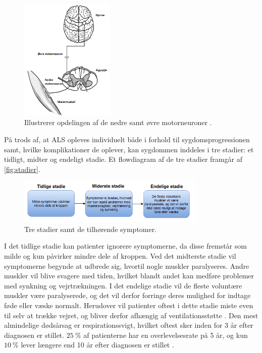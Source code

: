 \begin{figure}[H]
\centering
\includegraphics[width=0.4\textwidth]{figures/motorneuroner.png}
\caption{Illustrerer opdelingen af de nedre samt øvre motorneuroner \citep{miller2005}.}
\label{fig:motorneuroner}
\end{figure}

\noindent
På trods af, at ALS opleves individuelt både i forhold til sygdomsprogressionen samt, hvilke komplikationer de oplever, kan sygdommen inddeles i tre stadier: et tidligt, midter og endeligt stadie. Et flowdiagram af de tre stadier framgår af \autoref{fig:stadier}.

\begin{figure}[H]
\centering
\includegraphics[width=0.8\textwidth]{figures/stadier.png}
\caption{Tre stadier samt de tilhørende symptomer.}
\label{fig:stadier}
\end{figure}

\noindent
I det tidlige stadie kan patienter ignorere symptomerne, da disse fremstår som milde og kun påvirker mindre dele af kroppen. 
Ved det midterste stadie vil symptomerne begynde at udbrede sig, hvortil nogle muskler paralyseres. Andre muskler vil blive svagere med tiden, hvilket blandt andet kan medføre problemer med synkning og vejrtrækningen. I det endelige stadie vil de fleste voluntære muskler være paralyserede, og det vil derfor forringe deres mulighed for indtage føde eller væske normalt. Herudover vil patienter oftest i dette stadie miste even til selv at trække vejret, og bliver derfor afhængig af ventilationsstøtte \citep{themusculardystrophyassociation2016}.
Den mest almindelige dødsårsag er respirationssvigt, hvilket oftest sker inden for 3 år efter diagnosen er stillet. $25~\%$ af patienterne har en overlevelsesrate på 5 år, og kun $10~\%$ lever længere end 10 år efter diagnosen er stillet \citep{grehl2011, miller2005}.




